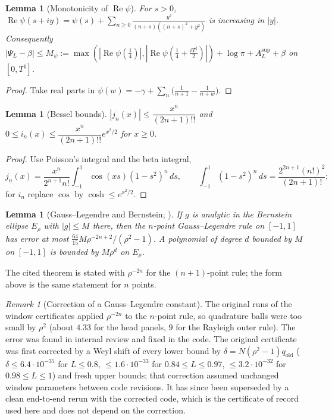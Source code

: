 \documentclass[11pt]{amsart}
\newcommand{\re}{\operatorname{Re}}
\newcommand{\Tsh}{T^{\sharp}}
\newcommand{\e}[1]{\cdot 10^{#1}}
\newtheorem{lemma}[theorem]{Lemma}
\theoremstyle{definition}
\theoremstyle{remark}
\newtheorem{remark}[theorem]{Remark}
\numberwithin{equation}{section}
\begin{document}
\begin{lemma}[Monotonicity of $\re\psi$]\label{lem:M}
For $s>0$, $\re\psi(s+iy)=\psi(s)+\sum_{n\ge0}\frac{y^2}{(n+s)((n+s)^2+y^2)}$ is increasing in $|y|$. Consequently $|\Psi_L-\beta|\le M_\psi:=\max(|\re\psi(\tfrac14)|,|\re\psi(\tfrac14+\tfrac{i\Tsh}2)|)+\log\pi+A_L^{\sup}+\beta$ on $[0,\Tsh]$.
\end{lemma}
\begin{proof}
Take real parts in $\psi(w)=-\gamma+\sum_n\bigl(\frac1{n+1}-\frac1{n+w}\bigr)$.
\end{proof}

\begin{lemma}[Bessel bounds]\label{lem:J}
$|j_n(x)|\le\dfrac{x^n}{(2n+1)!!}$ and $0\le i_n(x)\le\dfrac{x^n}{(2n+1)!!}e^{x^2/2}$ for $x\ge0$.
\end{lemma}
\begin{proof}
Use Poisson's integral and the beta integral,
\[
j_n(x)=\frac{x^n}{2^{n+1}n!}\int_{-1}^1\cos(xs)(1-s^2)^n\,ds,\qquad\int_{-1}^1(1-s^2)^n\,ds=\frac{2^{2n+1}(n!)^2}{(2n+1)!};
\]
for $i_n$ replace $\cos$ by $\cosh\le e^{x^2/2}$.
\end{proof}

\begin{lemma}[Gauss--Legendre and Bernstein; {\cite[Thm.~19.3]{Trefethen}}]\label{lem:G}
If $g$ is analytic in the Bernstein ellipse $E_\rho$ with $|g|\le M$ there, then the $n$-point Gauss--Legendre rule on $[-1,1]$ has error at most $\frac{64}{15}M\rho^{-2n+2}/(\rho^2-1)$. A polynomial of degree $d$ bounded by $M$ on $[-1,1]$ is bounded by $M\rho^d$ on $E_\rho$.
\end{lemma}
\noindent The cited theorem is stated with $\rho^{-2n}$ for the $(n+1)$-point rule; the form above is the same statement for $n$ points.

\begin{remark}[Correction of a Gauss--Legendre constant]\label{rem:erratum}
The original runs of the window certificates applied $\rho^{-2n}$ to the $n$-point rule, so quadrature balls were too small by $\rho^2$ (about $4.33$ for the head panels, $9$ for the Rayleigh outer rule). The error was found in internal review and fixed in the code. The original certificate was first corrected by a Weyl shift of every lower bound by $\delta=N(\rho^2-1)q_{\mathrm{old}}$ ($\delta\le6.4\e{-35}$ for $L\le0.8$, $\le1.6\e{-33}$ for $0.84\le L\le0.97$, $\le3.2\e{-32}$ for $0.98\le L\le1$) and fresh upper bounds; that correction assumed unchanged window parameters between code revisions. It has since been superseded by a clean end-to-end rerun with the corrected code, which is the certificate of record used here and does not depend on the correction.
\end{remark}
\end{document}
